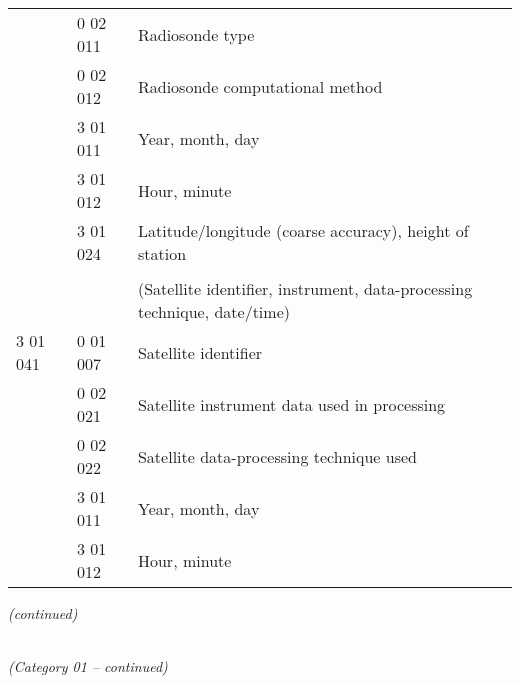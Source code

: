\begin{longtable}[]{@{}llll@{}}
& 0 02 011 & Radiosonde type &\tabularnewline
& 0 02 012 & Radiosonde computational method &\tabularnewline
& 3 01 011 & Year, month, day &\tabularnewline
& 3 01 012 & Hour, minute &\tabularnewline
& 3 01 024 & Latitude/longitude (coarse accuracy), height of station &\tabularnewline
& & &\tabularnewline
& & (Satellite identifier, instrument, data-processing technique, date/time) &\tabularnewline
3 01 041 & 0 01 007 & Satellite identifier &\tabularnewline
& 0 02 021 & Satellite instrument data used in processing &\tabularnewline
& 0 02 022 & Satellite data-processing technique used &\tabularnewline
& 3 01 011 & Year, month, day &\tabularnewline
& 3 01 012 & Hour, minute &\tabularnewline
\bottomrule
\end{longtable}

\emph{(continued)}

\emph{\\
(Category 01 -- continued)}

